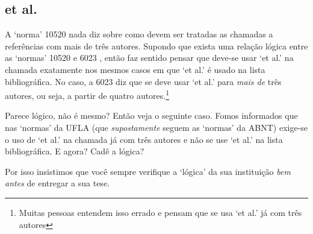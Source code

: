 \documentclass[a4paper]{ltxdoc}
\begin{document}
\subsection{et al.}

A `norma' 10520 \cite{NBR10520:2001} nada diz sobre como devem ser tratadas as
chamadas a referências com mais de três autores. Supondo que exista uma relação
lógica entre as `normas' 10520 \cite{NBR10520:2001} e 6023 \cite{NBR6023:2000},
então faz sentido pensar que deve-se usar `et al.' na chamada exatamente nos
mesmos casos em que `et al.' é usado na lista bibliográfica. No caso, a 6023 diz
que se deve usar `et al.' para \emph{mais de} três autores, ou seja, a partir
de quatro autores.\footnote{Muitas pessoas entendem isso errado e pensam
que se usa `et al.' já com três autores}

Parece lógico, não é mesmo? Então veja o seguinte caso. Fomos informados que
nas `normas' da UFLA (que \emph{supostamente} seguem as `normas' da ABNT)
exige-se o uso de `et al.' na chamada já com três autores e não se use `et al.'
na lista bibliográfica. E agora? Cadê a lógica?

Por isso insistimos que você sempre verifique a `lógica' da sua instituição
\emph{bem antes} de entregar a sua tese.


\end{document}
